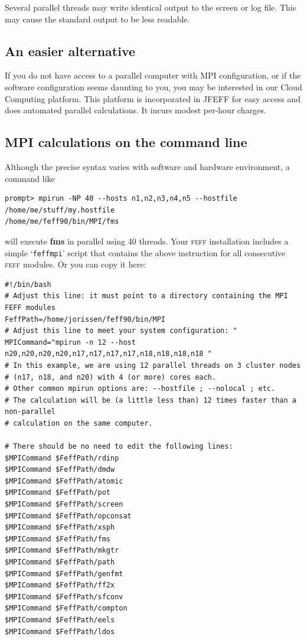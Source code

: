 \documentclass[11pt,oneside]{report} %
\renewcommand{\htmlref}[2]{\hyperlink{#2}{#1}}
\newcommand{\program}[1]{\textsc{#1}}
\newcommand{\feff}{\program{feff}}
\newcommand{\file}[1]{`\texttt{#1}'}
\newcommand{\module}[1]{\textrm{\bf{#1}}}
\renewcommand{\htmlref}[2]{{#1}} %
\begin{document}
Several parallel threads may write identical output to the screen or log file.  This may cause the standard output to be less readable.

\subsection{An easier alternative}
If you do not have access to a parallel computer with MPI configuration, or if the software configuration seems daunting to you, you may be interested in our \htmlref{Cloud Computing platform}{Sec:Cloud}.  This platform is incorporated in JFEFF for easy access and does automated parallel calculations.  It incurs modest per-hour charges.

\subsection{MPI calculations on the command line}
  
    Although the precise syntax varies with software and hardware environment, a command like
\begin{verbatim}
prompt> mpirun -NP 40 --hosts n1,n2,n3,n4,n5 --hostfile /home/me/stuff/my.hostfile 
/home/me/feff90/bin/MPI/fms
\end{verbatim}
will execute \module{fms} in parallel using 40 threads.  Your {\feff} installation includes a simple \file{feffmpi} script that contains the above instruction for all consecutive {\feff} modules.  Or you can copy it here:

\begin{verbatim}
#!/bin/bash
# Adjust this line: it must point to a directory containing the MPI FEFF modules
FeffPath=/home/jorissen/feff90/bin/MPI
# Adjust this line to meet your system configuration: "
MPICommand="mpirun -n 12 --host n20,n20,n20,n20,n17,n17,n17,n17,n18,n18,n18,n18 "
# In this example, we are using 12 parallel threads on 3 cluster nodes 
# (n17, n18, and n20) with 4 (or more) cores each.
# Other common mpirun options are: --hostfile ; --nolocal ; etc.
# The calculation will be (a little less than) 12 times faster than a non-parallel 
# calculation on the same computer.

# There should be no need to edit the following lines:
$MPICommand $FeffPath/rdinp
$MPICommand $FeffPath/dmdw
$MPICommand $FeffPath/atomic
$MPICommand $FeffPath/pot
$MPICommand $FeffPath/screen
$MPICommand $FeffPath/opconsat
$MPICommand $FeffPath/xsph
$MPICommand $FeffPath/fms
$MPICommand $FeffPath/mkgtr
$MPICommand $FeffPath/path
$MPICommand $FeffPath/genfmt
$MPICommand $FeffPath/ff2x
$MPICommand $FeffPath/sfconv
$MPICommand $FeffPath/compton
$MPICommand $FeffPath/eels
$MPICommand $FeffPath/ldos
\end{verbatim}
\end{document}
